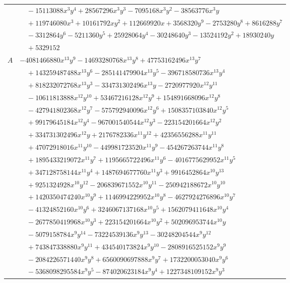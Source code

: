 \documentclass[11pt]{article}
\begin{document}
\begin{longtable}{@{}ll@{}}
 & $\quad -15113088x^{3}y^{4}+28567296x^{3}y^{3}-7095168x^{3}y^{2}-38563776x^{3}y$\\
 & $\quad +119746080x^{3}+10161792xy^{2}+112669920x+3568320y^{9}-2753280y^{8}+8616288y^{7}$\\
 & $\quad -3312864y^{6}-5211360y^{5}+25928064y^{4}-30248640y^{3}-13524192y^{2}+18930240y$\\
 & $\quad +5329152$\\
$A$ & $-4081466880x^{13}y^{9}-14693280768x^{13}y^{8}+47753162496x^{13}y^{7}$\\
 & $\quad +143259487488x^{13}y^{6}-285141479904x^{13}y^{5}-396718580736x^{13}y^{4}$\\
 & $\quad +818232072768x^{13}y^{3}-334731302496x^{13}y-2720977920x^{12}y^{11}$\\
 & $\quad -10611813888x^{12}y^{10}+53467216128x^{12}y^{9}+154891668096x^{12}y^{8}$\\
 & $\quad -427941802368x^{12}y^{7}-575792940096x^{12}y^{6}+1508357103840x^{12}y^{5}$\\
 & $\quad +99179645184x^{12}y^{4}-967001540544x^{12}y^{3}-223154201664x^{12}y^{2}$\\
 & $\quad +334731302496x^{12}y+2176782336x^{11}y^{12}+42356556288x^{11}y^{11}$\\
 & $\quad +47072918016x^{11}y^{10}-449981723520x^{11}y^{9}-454267263744x^{11}y^{8}$\\
 & $\quad +1895433219072x^{11}y^{7}+1195665722496x^{11}y^{6}-4016775629952x^{11}y^{5}$\\
 & $\quad +347128758144x^{11}y^{4}+1487694677760x^{11}y^{3}+9916452864x^{10}y^{13}$\\
 & $\quad +9251324928x^{10}y^{12}-206839671552x^{10}y^{11}-250942188672x^{10}y^{10}$\\
 & $\quad +1420350474240x^{10}y^{9}+1146994229952x^{10}y^{8}-4627924276896x^{10}y^{7}$\\
 & $\quad -41324852160x^{10}y^{6}+3246067137168x^{10}y^{5}+1562079411648x^{10}y^{4}$\\
 & $\quad -2677850419968x^{10}y^{3}+223154201664x^{10}y^{2}+502096953744x^{10}y$\\
 & $\quad -5079158784x^{9}y^{14}-73224539136x^{9}y^{13}-30248204544x^{9}y^{12}$\\
 & $\quad +743847338880x^{9}y^{11}+434540173824x^{9}y^{10}-2808916525152x^{9}y^{9}$\\
 & $\quad -2084226571440x^{9}y^{8}+6560090697888x^{9}y^{7}+1732200053040x^{9}y^{6}$\\
 & $\quad -5368098295584x^{9}y^{5}-874020623184x^{9}y^{4}+1227348109152x^{9}y^{3}$\\

\end{longtable}
\end{document}
